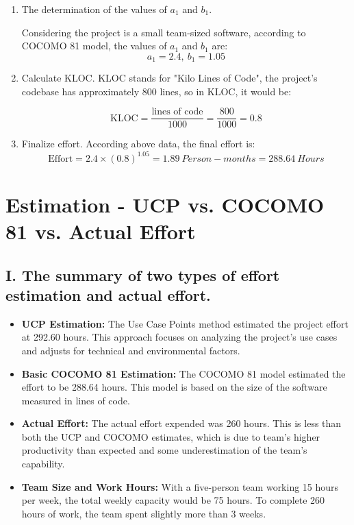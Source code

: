 \documentclass[english,12pt,a4paper]{report}
\begin{document}
	\begin{enumerate}[label=\Roman*., align=left, leftmargin=*]
		\item The determination of the values of $a_1$ and $b_1$.
		
		Considering the project is a small team-sized software, according to COCOMO 81 model, the values of $a_1$ and $b_1$ are:
		\begin{equation}
			a_1 = 2.4, \ b_1 = 1.05
		\end{equation}
		
		\item Calculate KLOC.
		KLOC stands for "Kilo Lines of Code", the project's codebase has approximately 800 lines, so in KLOC, it would be:
		
		\begin{equation}
			\text{KLOC} = \frac{\text{lines of code}}{1000} = \frac{800}{1000} = 0.8
		\end{equation}
		
		
		\item Finalize effort.
		According above data, the final effort is:
		\begin{equation}
			\text{Effort} = 2.4 \times (0.8)^{1.05} = 1.89\ Person-months = 288.64\ Hours
		\end{equation}
		
	\end{enumerate}
	
	
	
	\section{Estimation - UCP vs. COCOMO 81 vs. Actual Effort }
	\subsection*{I. The summary of two types of effort estimation and actual effort.}
	
	\begin{itemize}[leftmargin=*]
		\item \textbf{UCP Estimation:} The Use Case Points method estimated the project effort at 292.60 hours. This approach focuses on analyzing the project's use cases and adjusts for technical and environmental factors.
		
		\item \textbf{Basic COCOMO 81 Estimation:} The COCOMO 81 model estimated the effort to be 288.64 hours. This model is based on the size of the software measured in lines of code.
		
		\item \textbf{Actual Effort:} The actual effort expended was 260 hours. This is less than both the UCP and COCOMO estimates, which is due to team's higher productivity than expected and some underestimation of the team's capability.
		
		\item \textbf{Team Size and Work Hours:} With a five-person team working 15 hours per week, the total weekly capacity would be 75 hours. To complete 260 hours of work, the team spent slightly more than 3 weeks.
	\end{itemize}
	
\end{document}
